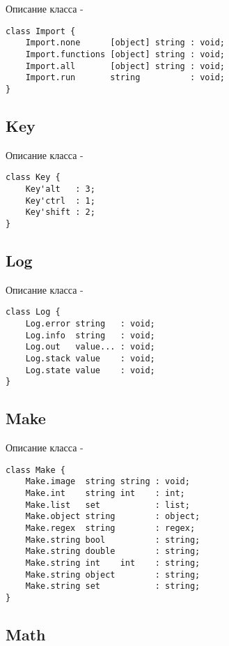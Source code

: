 \noindent Описание класса  -
\begin{lstlisting}[numbers=none]
class Import {
    Import.none      [object] string : void;
	Import.functions [object] string : void;
	Import.all       [object] string : void;
	Import.run       string          : void;
}
\end{lstlisting}

\subsection{{\color{orange} Key}}

\noindent Описание класса  -
\begin{lstlisting}[numbers=none]
class Key {
    Key'alt   : 3;
	Key'ctrl  : 1;
	Key'shift : 2;
}
\end{lstlisting}

\subsection{{\color{orange} Log}}

\noindent Описание класса  -
\begin{lstlisting}[numbers=none]
class Log {
    Log.error string   : void;
	Log.info  string   : void;
	Log.out   value... : void;
	Log.stack value    : void;
	Log.state value    : void;
}
\end{lstlisting}

\subsection{{\color{orange} Make}}

\noindent Описание класса  -
\begin{lstlisting}[numbers=none]
class Make {
    Make.image  string string : void;
	Make.int    string int    : int;
	Make.list   set           : list;
	Make.object string        : object;
	Make.regex  string        : regex;
	Make.string bool          : string;
	Make.string double        : string;
	Make.string int    int    : string;
	Make.string object        : string;
	Make.string set           : string;
}
\end{lstlisting}

\subsection{{\color{orange} Math}}

